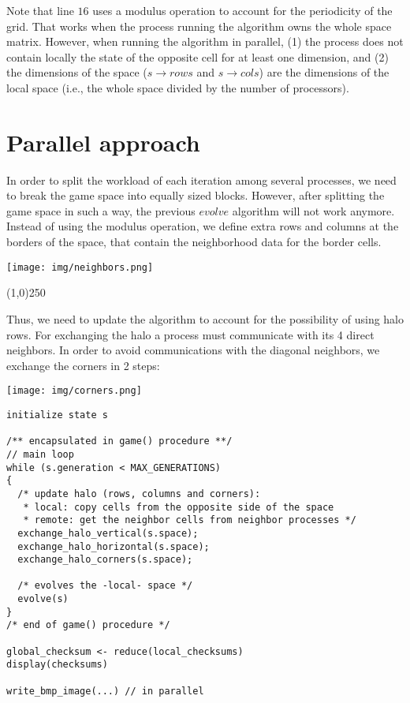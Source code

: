 \documentclass[a4paper,12pt,openany]{article}
\begin{document}
Note that line $16$ uses a modulus operation to account for the periodicity of the grid.
That works when the process running the algorithm owns the whole space matrix.
However, when running the algorithm in parallel, (1) the process does not contain locally the state of the opposite cell for at least one dimension, and (2) the dimensions of the space ($s\rightarrow rows$ and $s\rightarrow cols$) are the dimensions of the local space
(i.e., the whole space divided by the number of processors).

\section{Parallel approach}

\begin{multicols}{2}
In order to split the workload of each iteration among several processes,
we need to break the game space into equally sized blocks.
However, after splitting the game space in such a way,
the previous $evolve$ algorithm will not work anymore.
Instead of using the modulus operation, we define extra rows and columns at the borders
of the space, that contain the neighborhood data for the border cells.
\columnbreak
\begin{center}
\texttt{[image: img/neighbors.png]}
\end{center}
\end{multicols}

\begin{center}
\line(1,0){250}
\end{center}

\begin{multicols}{2}
Thus, we need to update the algorithm to account for the possibility of using halo rows.
For exchanging the halo a process must communicate with its 4 direct neighbors.
In order to avoid communications with the diagonal neighbors, we exchange the
corners in 2 steps:

\columnbreak
\begin{center}
\texttt{[image: img/corners.png]}
\end{center}
\end{multicols}

\begin{lstlisting}
initialize state s

/** encapsulated in game() procedure **/
// main loop
while (s.generation < MAX_GENERATIONS)
{
  /* update halo (rows, columns and corners):
   * local: copy cells from the opposite side of the space
   * remote: get the neighbor cells from neighbor processes */
  exchange_halo_vertical(s.space);
  exchange_halo_horizontal(s.space);
  exchange_halo_corners(s.space);

  /* evolves the -local- space */
  evolve(s)
}
/* end of game() procedure */

global_checksum <- reduce(local_checksums)
display(checksums)

write_bmp_image(...) // in parallel
\end{lstlisting}
\end{document}
